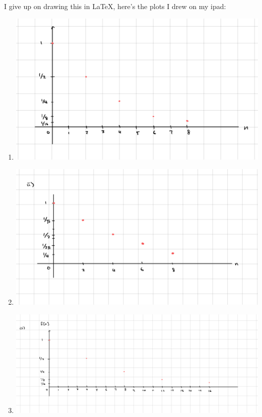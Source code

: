 \documentclass[10pt]{article}
\begin{document}
\begin{enumerate}[label=\alph*)]
			\begin{solution}
				I give up on drawing this in \LaTeX{}, here's the plots I drew on my ipad:
				\begin{enumerate}[label=\roman*)]
					\item 
						\begin{center}
							\includegraphics[scale=0.2]{q3ci.jpeg}
						\end{center}
					\item 
						\begin{center}
							\includegraphics[scale=0.2]{q3cii.jpeg}
						\end{center}
					\item 
						\begin{center}
							\includegraphics[scale=0.15]{q3ciii.jpeg}
						\end{center}
				\end{enumerate}
			\end{solution}
	\end{enumerate}
	\pagebreak
\end{document}
